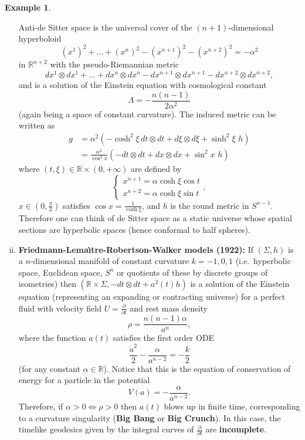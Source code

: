 \documentclass[10pt]{amsart}
\newcommand{\bbR}{\mathbb{R}}      %
\theoremstyle{definition}
\newtheorem{Example}[Thm]{Example}
\theoremstyle{remark}
\begin{document}
\begin{Example}
\begin{enumerate}[(i)]
Anti-de Sitter space is the universal cover of the $(n+1)$-dimensional hyperboloid
\[
(x^1)^2 + \ldots + (x^n)^2 - (x^{n+1})^2 - (x^{n+2})^2 = - \alpha^2
\]
in $\bbR^{n+2}$ with the pseudo-Riemannian metric
\[
dx^1 \otimes dx^1 + \ldots + dx^n \otimes dx^n - dx^{n+1} \otimes dx^{n+1} - dx^{n+2} \otimes dx^{n+2},
\]
and is a solution of the Einstein equation with cosmological constant 
\[
\Lambda=-\frac{n(n-1)}{2\alpha^2}
\]
(again being a space of constant curvature). The induced metric can be written as
\begin{align*}
g & =  \alpha^2 \left( - \cosh^2 \xi \, dt \otimes dt +  d\xi \otimes d\xi +\sinh^2 \xi  \,\, h \right) \\
& = \frac{\alpha^2}{\cos^2 x} \left(- dt \otimes dt + dx \otimes dx + \sin^2 x \,\, h \right)
\end{align*}
where $(t,\xi) \in \bbR \times \left(0,+\infty\right)$ are defined by 
\[
\begin{cases}
x^{n+1}=\alpha \cosh \xi \cos t\\
x^{n+2}=\alpha \cosh \xi \sin t
\end{cases},
\]
$x \in \left(0,\frac\pi2\right)$ satisfies $\cos x = \frac1{\cosh \xi}$, and $h$ is the round metric in $S^{n-1}$. Therefore one can think of de Sitter space as a static universe whose spatial sections are hyperbolic spaces (hence conformal to half spheres).

\item
{\bf Friedmann-Lema\^\i tre-Robertson-Walker models (1922):} If $(\Sigma,h)$ is a $n$-dimensional manifold of constant curvature $k=-1,0,1$ (i.e.~hyperbolic space, Euclidean space, $S^n$ or quotients of these by discrete groups of isometries) then $(\bbR \times \Sigma, -dt \otimes dt + a^2(t) h)$ is a solution of the Einstein equation (representing an expanding or contracting universe) for a perfect fluid with velocity field $U = \frac{\partial}{\partial t}$ and rest mass density
\[
\rho = \frac{n(n-1) \alpha}{a^n},
\]
where the function $a(t)$ satisfies the first order ODE
\[
\frac{\dot{a}^2}{2} - \frac{\alpha}{a^{n-2}} = - \frac{k}2
\]
(for any constant $\alpha \in \bbR$). Notice that this is the equation of conservation of energy for a particle in the potential
\[
V(a) = - \frac{\alpha}{a^{n-2}}.
\]
Therefore, if $\alpha>0 \Leftrightarrow \rho > 0$ then $a(t)$ blows up in finite time, corresponding to a curvature singularity ({\bf Big Bang} or {\bf Big Crunch}). In this case, the timelike geodesics given by the integral curves of $\frac{\partial}{\partial t}$ are {\bf incomplete}.
\end{enumerate}
\end{Example}
\end{document}

